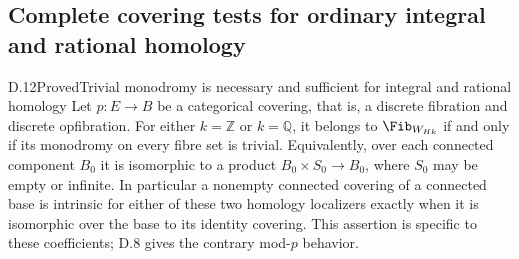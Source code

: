 \subsection{Complete covering tests for ordinary integral and rational homology}
\begin{claim}{D.12}{Proved}{Trivial monodromy is necessary and sufficient for integral and rational homology}
Let $p:E\to B$ be a categorical covering, that is, a discrete fibration and discrete opfibration. For either $k=\mathbb Z$ or $k=\mathbb Q$, it belongs to $\Fib_{W_{Hk}}$ if and only if its monodromy on every fibre set is trivial. Equivalently, over each connected component $B_0$ it is isomorphic to a product $B_0\times S_0\to B_0$, where $S_0$ may be empty or infinite. In particular a nonempty connected covering of a connected base is intrinsic for either of these two homology localizers exactly when it is isomorphic over the base to its identity covering. This assertion is specific to these coefficients; D.8 gives the contrary mod-$p$ behavior.
\end{claim}
